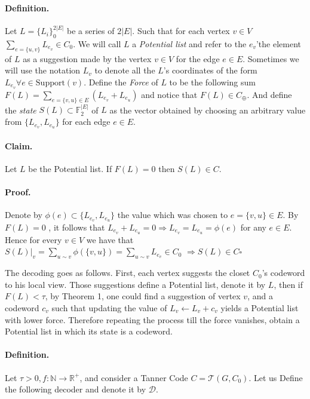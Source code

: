 \documentclass{article}
\begin{document}
\begin{multicols*}{2}
  \paragraph{Definition.}Let $L = \{L_{i}\}^{2|E|}_{0}$  be a series of $2|E|$. Such that for each vertex $ v \in V$ $\sum_{ e = \{u,v\} }{ L_{e_v} } \in C_{0}$. We will call $L$ a \textit{Potential list} and refer to the $e_{v}$'the element of $L$ as a suggestion made by the vertex $v \in V$ for the edge $e \in E$. Sometimes we will use the notation $L_{v}$ to denote all the $L$'s coordinates of the form $ L_{e_{v}} \forall e \in \text{Support} \left( v \right) $. Define the \textit{Force} of $L$ to be the following sum $  F\left( L \right) = \sum_{e = \{v,u\} \in E }{ \left(L_{e_v} + L_{e_u}\right) }$ and notice that $ F\left( L \right) \in C_{\oplus}$. And define the \textit{state} $S(L) \subset \mathbb{F}^{|E|}_{2}$ of $L$ as the vector obtained by choosing an arbitrary value from $ \{ L_{e_v}, L_{e_u} \}$ for each edge $e \in E$.  
  \paragraph{Claim.} Let $L$ be the Potential list. If $F(L)=0$ then $S(L)\in C$.
  \paragraph{Proof.} Denote by $\phi\left( e \right) \subset \{ L_{e_v}, L_{e_u} \}$ the value which was chosen to $e = \{v,u\} \in E$. By $F\left(L\right) = 0$ , it follows that $ L_{e_v} + L_{e_u} = 0 \Rightarrow L_{e_v} = L_{e_u} = \phi\left( e \right) $ for any $e \in E$. Hence for every $v\in V$ we have that $ S\left( L \right)|_{v} = \sum_{u \sim v}{ \phi\left( \{v,u\} \right) } =  \sum_{u \sim v}{ L_{e_v }} \in C_{0}$ $ \Rightarrow S\left( L \right) \in C \square$   

  The decoding goes as follows. First, each vertex suggests the closet $C_{0}$'s codeword to his local view. Those suggestions define a Potential list, denote it by $L$, then if $F\left( L \right) <\tau$, by Theorem 1, one could find a suggestion of vertex $v$, and a codeword $c_v$ such that updating the value of $L_{v} \leftarrow L_{v} + c_{v}$ yields a Potential list with lower force. Therefore repeating the process till the force vanishes, obtain a Potential list in which its state is a codeword. 
  \paragraph{Definition.} Let $\tau > 0, f : \mathbb{N} \rightarrow \mathbb{R^{+}}$, and consider a Tanner Code $C = \mathcal{T}\left( G, C_{0} \right)$. Let us Define the following decoder and denote it by $\mathcal{D}$.  

\end{multicols*}
\end{document}
